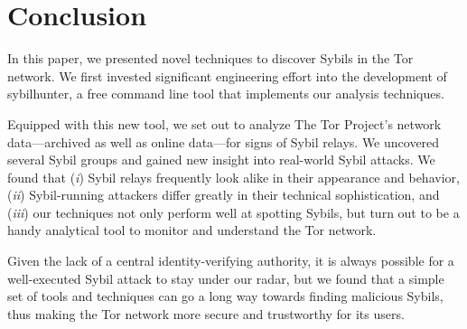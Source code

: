 \section{Conclusion}
\label{sec:conclusion}
In this paper, we presented novel techniques to discover Sybils in the Tor
network.  We first invested significant engineering effort into the development
of sybilhunter, a free command line tool that implements our analysis
techniques.

Equipped with this new tool, we set out to analyze The Tor Project's network
data---archived as well as online data---for signs of Sybil relays.  We
uncovered several Sybil groups and gained new insight into real-world Sybil
attacks.  We found that (\emph{i}) Sybil relays frequently look alike in their
appearance and behavior, (\emph{ii}) Sybil-running attackers differ greatly in
their technical sophistication, and (\emph{iii}) our techniques not only perform
well at spotting Sybils, but turn out to be a handy analytical tool to monitor
and understand the Tor network.

Given the lack of a central identity-verifying authority, it is always possible
for a well-executed Sybil attack to stay under our radar, but we found that a
simple set of tools and techniques can go a long way towards finding malicious
Sybils, thus making the Tor network more secure and trustworthy for its users.


